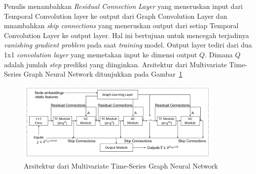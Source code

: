 Penulis menambahkan \textit{Residual Connection Layer} yang meneruskan input dari Temporal Convolution layer ke output dari Graph Convolution Layer  dan mnambahkan \textit{skip connections} yang meneruskan output dari setiap Temporal Convolution Layer ke output layer. Hal ini bertujuan untuk mencegah terjadinya \textit{vanishing gradient problem} pada saat \textit{training} model. Output layer tediri dari dua 1x1 \textit{convolution layer} yang memetakan input ke dimensi output $Q$. Dimana $Q$ adalah jumlah \textit{step} prediksi yang diinginkan. Arsitektur dari Multivariate Time-Series Graph Neural Network ditunjukkan pada Gambar~\ref{fig:mtgnn-architecture}


\begin{figure}[H]
    \centering
    \includegraphics[width=0.9\textwidth]{figures/mtgnn.png}
    \caption{Arsitektur dari Multivariate Time-Series Graph Neural Network}
    \label{fig:mtgnn-architecture}
\end{figure}
